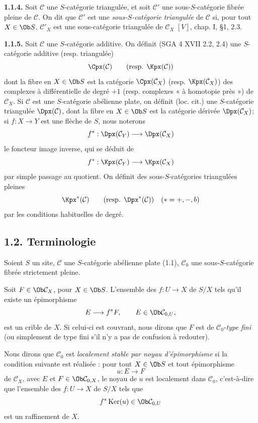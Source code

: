 \documentclass[11pt]{article}
\providecommand{\Ker}{\operatorname{Ker}}
\begin{document}
\textbf{1.1.4.} Soit \(\mathcal C\) une \(S\)-catégorie triangulée, et soit \(\mathcal C'\) une sous-\(S\)-catégorie fibrée pleine de \(\mathcal C\). On dit que \(\mathcal C'\) est une \emph{sous-\(S\)-catégorie triangulée} de \(\mathcal C\) si, pour tout \(X\in\Ob S\), \(\mathcal C'_X\) est une sous-catégorie triangulée de \(\mathcal C_X\) \([V]\), chap. I, §1, 2.3.

\textbf{1.1.5.} Soit \(\mathcal C\) une \(S\)-catégorie additive. On définit (SGA 4 XVII 2.2, 2.4) une \(S\)-catégorie additive (resp. triangulée)
\[
  \Cpx(\mathcal C)\qquad\text{(resp. }\Kpx(\mathcal C)\text{)}
\]
dont la fibre en \(X\in\Ob S\) est la catégorie \(\Cpx(\mathcal C_X)\) (resp. \(\Kpx(\mathcal C_X)\)) des complexes à différentielle de degré \(+1\) (resp. complexes « à homotopie près ») de \(\mathcal C_X\). Si \(\mathcal C\) est une \(S\)-catégorie abélienne plate, on définit (loc. cit.) une \(S\)-catégorie triangulée \(\Dpx(\mathcal C)\), dont la fibre en \(X\in\Ob S\) est la catégorie dérivée \(\Dpx(\mathcal C_X)\); si \(f:X\to Y\) est une flèche de \(S\), nous noterons
\[
  f^*:\Dpx(\mathcal C_Y)\longrightarrow \Dpx(\mathcal C_X)
\]
le foncteur image inverse, qui se déduit de
\[
  f^*:\Kpx(\mathcal C_Y)\longrightarrow \Kpx(\mathcal C_X)
\]
par simple passage au quotient. On définit des sous-\(S\)-catégories triangulées pleines
\[
  \Kpx^*(\mathcal C)\qquad\text{(resp. }\Dpx^*(\mathcal C)\text{)}
  \quad (*=+,-,b)
\]
par les conditions habituelles de degré.

\subsection*{1.2. Terminologie}

Soient \(S\) un site, \(\mathcal C\) une \(S\)-catégorie abélienne plate (1.1), \(\mathcal C_0\) une sous-\(S\)-catégorie fibrée strictement pleine.

Soit \(F\in\Ob\mathcal C_X\), pour \(X\in\Ob S\). L'ensemble des \(f:U\to X\) de \(S/X\) tels qu'il existe un épimorphisme
\[
  E\longrightarrow f^*F,\qquad E\in\Ob\mathcal C_{0,U},
\]
est un crible de \(X\). Si celui-ci est couvrant, nous dirons que \(F\) est de \(\mathcal C_0\)-\emph{type fini} (ou simplement de type fini s'il n'y a pas de confusion à redouter).

Nous dirons que \(\mathcal C_0\) est \emph{localement stable par noyau d'épimorphisme} si la condition suivante est réalisée : pour tout \(X\in\Ob S\) et tout épimorphisme
\[
  u:E\longrightarrow F
\]
de \(\mathcal C_X\), avec \(E\) et \(F\in\Ob\mathcal C_{0,X}\), le noyau de \(u\) est localement dans \(\mathcal C_0\), c'est-à-dire que l'ensemble des \(f:U\to X\) de \(S/X\) tels que
\[
  f^*\Ker(u)\in\Ob\mathcal C_{0,U}
\]
est un raffinement de \(X\).
\end{document}
